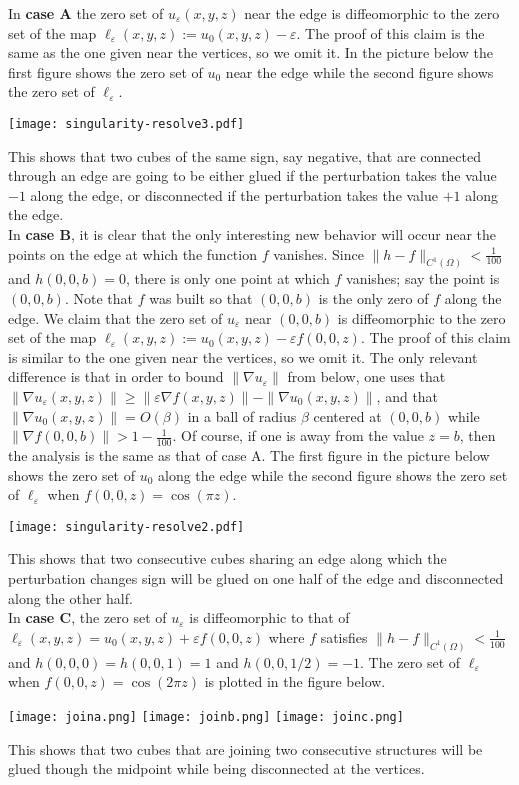 \documentclass[11pt,reqno]{amsart}
\newcommand{\ep}{\varepsilon}
\theoremstyle{definition}
\begin{document}
In {\bf case A} the zero set of $u_\ep(x,y,z)$  near the edge is diffeomorphic to the zero set of the map $\ell_\ep(x,y,z):= u_0(x,y,z)-\ep$. The proof of this claim is the same as  the one given near the vertices, so we omit it. In the picture below the first figure shows the zero set of $u_0$ near the edge while the second figure shows the zero set of $\ell_\ep$. 
   \begin{center}
\texttt{[image: singularity-resolve3.pdf]}
 \end{center}
 This shows that two cubes of the same sign, say negative, that are connected through an edge are going to be either glued if the perturbation takes the value $-1$ along the edge, or disconnected if the perturbation takes the value $+1$ along the edge.\\

In {\bf case B}, it is clear that the only interesting new behavior will occur near the points on the edge at which the function $f$ vanishes.  Since $\|h-f\|_{C^1(\Omega)}< \frac{1}{100}$ and $h(0,0,b)=0$, there is only one point at which $f$ vanishes; say the point is $(0,0,b)$. Note that $f$ was built so that $(0,0,b)$ is the only zero of $f$ along the edge. We claim that the  zero set of $u_\ep$ near $(0,0,b)$  is diffeomorphic to the zero set of the map $\ell_\ep(x,y,z):=u_0(x,y,z)-\ep f(0,0,z)$.  The proof of this claim is similar to the one given near the vertices, so we omit it.  The only  relevant difference is that in order to bound $\|\nabla u_\ep\|$ from below, one uses that $\|\nabla u_\ep (x,y,z)\| \geq \|\ep \nabla f (x,y,z)\|- \|\nabla u_0 (x,y,z)\|$, and that $\|\nabla u_0 (x,y,z)\| =O(\beta)$ in a ball of radius $\beta$ centered at $(0,0,b)$ while  $\|\nabla f(0,0, b)\| > 1-\tfrac{1}{100}$. Of course, if one is away from the value $z=b$, then the analysis is the same as that of case A. The first figure in the picture below shows the zero set of $u_0$ along the edge while the second figure shows the zero set of $\ell_\ep$ when  $f(0,0,z)=\cos(\pi z)$.
  \begin{center}
\texttt{[image: singularity-resolve2.pdf]}
 \end{center}
 This shows that two consecutive cubes sharing an edge along which the perturbation changes sign will be glued on one half of the edge and disconnected along the other half.\\
 
 In {\bf case C}, the zero set of $u_\ep$ is diffeomorphic to that of $\ell_\ep(x,y,z)=u_0(x,y,z)+\ep f(0,0, z)$
 where $f$ satisfies $\|h-f\|_{C^1(\Omega)}< \frac{1}{100}$ and $h(0,0,0)=h(0,0,1)=1$ and $h(0,0,1/2)=-1$.
  The zero set of $\ell_\ep$ when $ f(0,0,z)=\cos(2 \pi z)$ is plotted in the figure below.
  \begin{center}
\texttt{[image: joina.png]}\quad\qquad\quad
\texttt{[image: joinb.png]}\quad\qquad\quad
\texttt{[image: joinc.png]}
 \end{center}
 This shows that two cubes that are joining two consecutive structures will be glued though the midpoint while being disconnected at the vertices.
 
\end{document}
